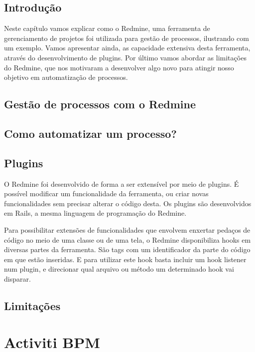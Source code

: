 \section{Introdução}\label{sec:LABEL_CHP_3_SEC_A}
Neste capítulo vamos explicar como o Redmine, uma ferramenta de gerenciamento de projetos foi utilizada para gestão de processos, ilustrando com um exemplo. Vamos apresentar ainda, as capacidade extensiva desta ferramenta, através do desenvolvimento de plugins. Por último vamos abordar as limitações do Redmine, que nos motivaram a desenvolver algo novo para atingir nosso objetivo em automatização de processos.

\section{Gestão de processos com o Redmine}\label{sec:LABEL_CHP_3_SEC_B}


\section{Como automatizar um processo?}\label{sec:LABEL_CHP_3_SEC_C}

\section{Plugins}\label{sec:LABEL_CHP_3_SEC_D}
O Redmine foi desenvolvido de forma a ser extensível por meio de plugins. É possível modificar um funcionalidade da ferramenta, ou criar novas funcionalidades sem precisar alterar o código desta. Os plugins são desenvolvidos em Rails, a mesma linguagem de programação do Redmine. 

Para possibilitar extensões de funcionalidades que envolvem enxertar pedaços de código no meio de uma classe ou de uma tela, o Redmine disponibiliza hooks em diversas partes da ferramenta. São tags com um identificador da parte do código em que estão inseridas. E para utilizar este hook basta incluir um hook listener num plugin, e direcionar qual arquivo ou método um determinado hook vai disparar.

\section{Limitações}\label{sec:LABEL_CHP_3_SEC_E}


\chapter{Activiti BPM}\label{chp:LABEL_CHP_4}

